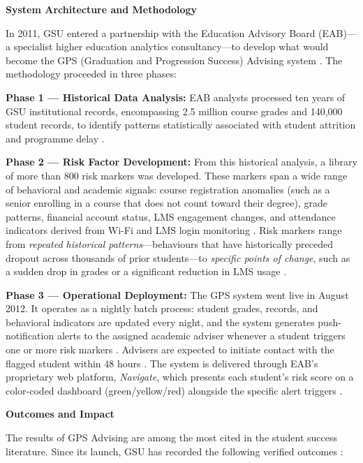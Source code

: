 \documentclass[12pt]{report}
\begin{document}
\textbf{System Architecture and Methodology}

In 2011, GSU entered a partnership with the Education Advisory Board
(EAB)---a specialist higher education analytics consultancy---to develop
what would become the GPS (Graduation and Progression Success) Advising
system \parencite{NPR2016, Hechinger2019}. The methodology proceeded
in three phases:

\textbf{Phase 1 --- Historical Data Analysis:} EAB analysts processed
ten years of GSU institutional records, encompassing 2.5 million course
grades and 140,000 student records, to identify patterns statistically
associated with student attrition and programme delay
\parencite{NPR2016, GSUCaseStudy2019}.

\textbf{Phase 2 --- Risk Factor Development:} From this historical
analysis, a library of more than 800 risk markers was developed. These
markers span a wide range of behavioral and academic signals: course
registration anomalies (such as a senior enrolling in a course that does
not count toward their degree), grade patterns, financial account status,
LMS engagement changes, and attendance indicators derived from Wi-Fi and
LMS login monitoring \parencite{GSU2024, EdTech2019}. Risk markers range
from \textit{repeated historical patterns}---behaviours that have
historically preceded dropout across thousands of prior students---to
\textit{specific points of change}, such as a sudden drop in grades or a
significant reduction in LMS usage \parencite{GSU2024}.

\textbf{Phase 3 --- Operational Deployment:} The GPS system went live in
August 2012. It operates as a nightly batch process: student grades,
records, and behavioral indicators are updated every night, and the system
generates push-notification alerts to the assigned academic adviser
whenever a student triggers one or more risk markers
\parencite{GSUCaseStudy2019, NPR2016}. Advisers are expected to initiate
contact with the flagged student within 48 hours \parencite{EdTech2019}.
The system is delivered through EAB's proprietary web platform,
\textit{Navigate}, which presents each student's risk score on a
color-coded dashboard (green/yellow/red) alongside the specific alert
triggers \parencite{Signal2019}.

\textbf{Outcomes and Impact}

The results of GPS Advising are among the most cited in the student
success literature. Since its launch, GSU has recorded the following
verified outcomes \parencite{GSU2024, GSUCaseStudy2019, NISS2024}:
\end{document}
